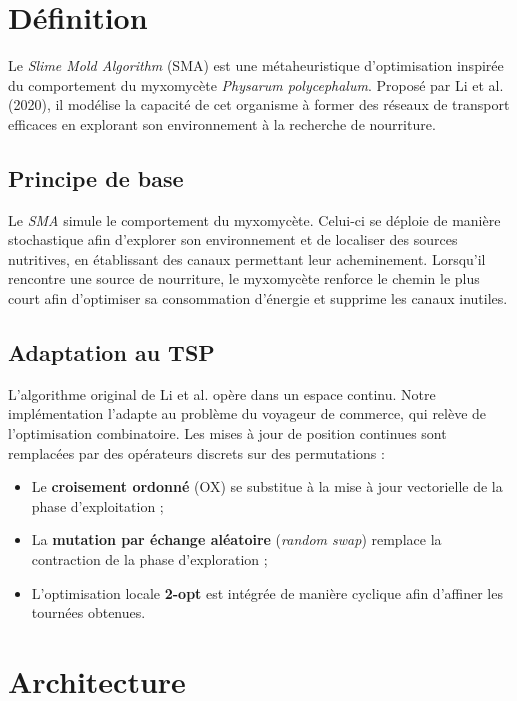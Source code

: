 \documentclass[12pt,a4paper]{report}
\begin{document}
\newpage

\chapter{Définition}

Le \textit{Slime Mold Algorithm} (SMA) est une métaheuristique d'optimisation
inspirée du comportement du myxomycète \textit{Physarum polycephalum}.
Proposé par Li et al. (2020), il modélise la capacité de cet organisme
à former des réseaux de transport efficaces en explorant son environnement
à la recherche de nourriture.

\section{Principe de base}
Le \textit{SMA} simule le comportement du myxomycète.
Celui-ci se déploie de manière stochastique afin d'explorer son environnement
et de localiser des sources nutritives, en établissant des canaux permettant
leur acheminement.
Lorsqu'il rencontre une source de nourriture, le myxomycète renforce le chemin le
plus court afin d'optimiser sa consommation d'énergie et supprime les
canaux inutiles.

\section{Adaptation au TSP}
L'algorithme original de Li et al. opère dans un espace continu. Notre
implémentation l'adapte au problème du voyageur de commerce, qui relève
de l'optimisation combinatoire. Les mises à jour de position continues
sont remplacées par des opérateurs discrets sur des permutations :
\begin{itemize}
	\item Le \textbf{croisement ordonné} (OX) se substitue à la mise à jour
	      vectorielle de la phase d'exploitation ;
	\item La \textbf{mutation par échange aléatoire} (\textit{random swap})
	      remplace la contraction de la phase d'exploration ;
	\item L'optimisation locale \textbf{2-opt} est intégrée de manière cyclique
	      afin d'affiner les tournées obtenues.
\end{itemize}

\chapter{Architecture}
\end{document}
